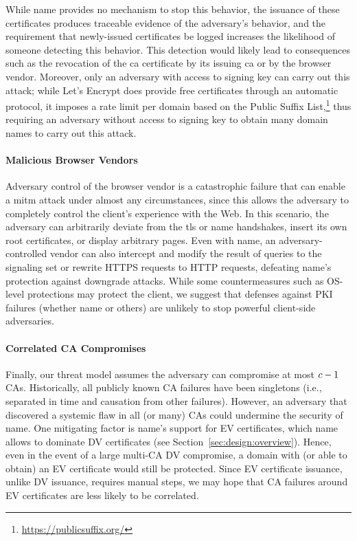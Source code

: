 While \ac{name} provides no mechanism to stop this behavior, the issuance of
these certificates produces traceable evidence of the adversary's behavior,
and the requirement that newly-issued certificates be logged increases the
likelihood of someone detecting this behavior. This detection would likely lead
to consequences such as the revocation of the \ac{ca} certificate by its issuing
\ac{ca} or by the browser vendor. Moreover, only an adversary with access to
 signing key can carry out this attack; while Let's Encrypt does provide
free certificates through an automatic protocol, it imposes a rate limit per
domain based on the Public Suffix
List,\footnote{\url{https://publicsuffix.org/}} thus requiring an adversary
without access to  signing key to obtain many domain names to carry out
this attack.

\paragraph{Malicious Browser Vendors}

Adversary control of the browser vendor is a catastrophic failure that can
enable a \ac{mitm} attack under almost any circumstances, since this allows the
adversary to completely control the client's experience with the Web. In this
scenario, the adversary can arbitrarily deviate from the \ac{tls} or \ac{name}
handshakes, insert its own root certificates, or display arbitrary pages. Even
with \ac{name}, an adversary-controlled vendor can also intercept and modify the
result of queries to the signaling set or rewrite HTTPS requests to HTTP
requests, defeating \ac{name}'s protection against downgrade attacks.
While some countermeasures such as OS-level protections may protect the client,
we suggest that defenses against PKI failures (whether \ac{name} or others)
are unlikely to stop powerful client-side adversaries.

\paragraph{Correlated CA Compromises}

Finally, our threat model assumes the adversary can compromise at most $c-1$
CAs. Historically, all publicly known CA failures have been singletons (i.e.,
separated in time and causation from other failures).  However, an adversary that discovered
a systemic flaw in all (or many) CAs could undermine the security of \ac{name}.
One mitigating factor is \ac{name}'s support for EV certificates,
which \ac{name} allows to dominate DV certificates (see Section~\ref{sec:design:overview}).
Hence, even in the event of a large multi-CA DV compromise,
a domain with (or able to obtain) an EV certificate would still be protected.
Since EV certificate issuance, unlike DV issuance, requires manual steps,
we may hope that CA failures around EV certificates are less likely to be correlated.

